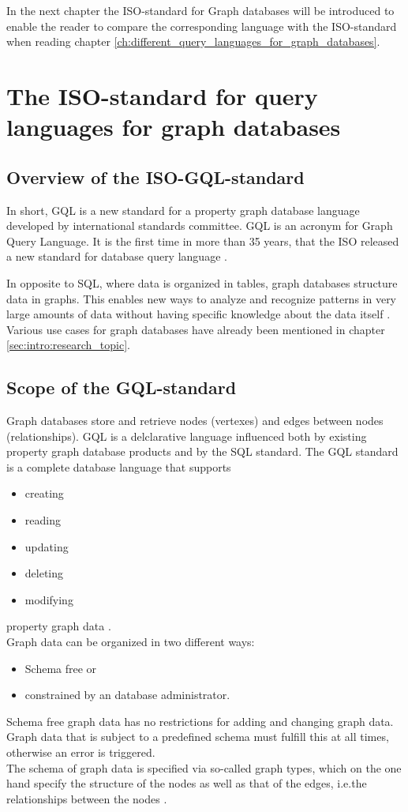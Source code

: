 In the next chapter the ISO-standard for Graph databases will be introduced to enable the reader 
to compare the corresponding language 
with the ISO-standard when reading chapter \ref{ch:different_query_languages_for_graph_databases}.

\chapter{The ISO-standard for query languages for graph databases}
\label{ch:iso}
\section{Overview of the ISO-GQL-standard}
\label{sec:iso:overview}
In short, GQL is a new standard for a property graph database language developed by 
international standards committee.
GQL is an acronym for Graph Query Language.
It is the first time in more than 35 years, that the ISO released a new 
standard for database query language \citep{hare_isoiec_2024}.

In opposite to SQL, where data is organized in tables, graph databases structure data in graphs. 
This enables new ways to analyze and recognize patterns in very large amounts of 
data without having specific knowledge about the data itself \citep{hare_isoiec_2024}.
Various use cases for graph databases have already been mentioned in chapter \ref{sec:intro:research_topic}.
\section{Scope of the GQL-standard}
\label{sec:iso:scope}
Graph databases store and retrieve nodes (vertexes) and
edges between nodes (relationships). GQL is a delclarative language influenced both by 
existing property graph database products and by the SQL standard.
The GQL standard is a complete database language that supports
\begin{itemize}
	\item creating
	\item reading
	\item updating
	\item deleting
	\item modifying
\end{itemize}
property graph data \citep{hare_isoiec_2024}. \\
Graph data can be organized in two different ways:
\begin{itemize}
    \item Schema free or
    \item constrained by an database administrator.
\end{itemize}
Schema free graph data has no restrictions for adding and changing graph data.
Graph data that is subject to a predefined schema must fulfill this at all times, 
otherwise an error is triggered.\\
The schema of graph data is specified via so-called graph types, 
which on the one hand specify the structure of the nodes as well as that of the edges, 
i.e.the relationships between the nodes \citep{hare_isoiec_2024}.
